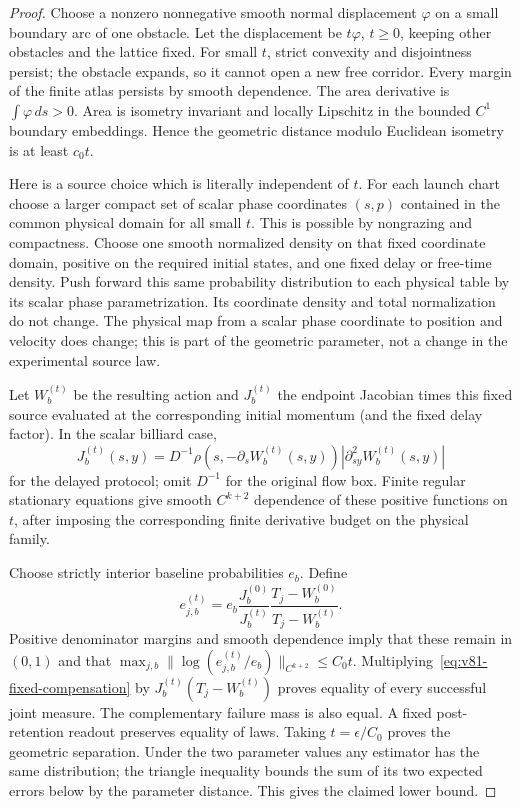 \begin{proof}
Choose a nonzero nonnegative smooth normal displacement $\varphi$ on
a small boundary arc of one obstacle.  Let the displacement be
$t\varphi$, $t\ge0$, keeping other obstacles and the lattice fixed.
For small $t$, strict convexity and disjointness persist; the obstacle
expands, so it cannot open a new free corridor.  Every margin of the
finite atlas persists by smooth dependence.  The area derivative is
$\int\varphi\,ds>0$.  Area is isometry invariant and locally Lipschitz
in the bounded $C^1$ boundary embeddings.  Hence the geometric distance
modulo Euclidean isometry is at least $c_0t$.

Here is a source choice which is literally independent of $t$.
For each launch chart choose a larger compact set of scalar phase
coordinates $(s,p)$ contained in the common physical domain for all
small $t$.  This is possible by nongrazing and compactness.  Choose one
smooth normalized density on that fixed coordinate domain, positive on
the required initial states, and one fixed delay or free-time density.
Push forward this same probability distribution to each physical table
by its scalar phase parametrization.  Its coordinate density and total
normalization do not change.  The physical map from a scalar phase
coordinate to position and velocity does change; this is part of the
geometric parameter, not a change in the experimental source law.

Let $W_b^{(t)}$ be the resulting action and $J_b^{(t)}$ the endpoint
Jacobian times this fixed source evaluated at the corresponding initial
momentum (and the fixed delay factor).  In the scalar billiard case,
\[
 J_b^{(t)}(s,y)=D^{-1}\rho(s,-\partial_sW_b^{(t)}(s,y))
                                  |\partial_{sy}^2W_b^{(t)}(s,y)|
\]
for the delayed protocol; omit $D^{-1}$ for the original flow box.
Finite regular stationary equations give smooth $C^{k+2}$ dependence
of these positive functions on $t$, after imposing the corresponding
finite derivative budget on the physical family.

Choose strictly interior baseline probabilities $e_b$.  Define
\begin{equation}\label{eq:v81-fixed-compensation}
 e_{j,b}^{(t)}=e_b\frac{J_b^{(0)}}{J_b^{(t)}}
                    \frac{T_j-W_b^{(0)}}{T_j-W_b^{(t)}}.
\end{equation}
Positive denominator margins and smooth dependence imply that these
remain in $(0,1)$ and that
$\max_{j,b}\|\log(e_{j,b}^{(t)}/e_b)\|_{C^{k+2}}\le C_0t$.
Multiplying~\eqref{eq:v81-fixed-compensation} by
$J_b^{(t)}(T_j-W_b^{(t)})$ proves equality of every successful joint
measure.  The complementary failure mass is also equal.  A fixed
post-retention readout preserves equality of laws.  Taking
$t=\epsilon/C_0$ proves the geometric separation.  Under the two
parameter values any estimator has the same distribution; the triangle
inequality bounds the sum of its two expected errors below by the
parameter distance.  This gives the claimed lower bound.
\end{proof}

